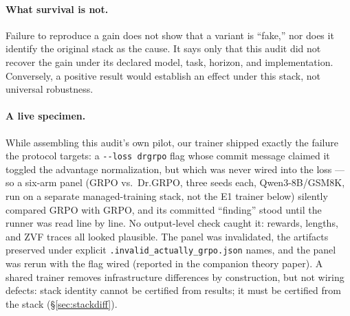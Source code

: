 \documentclass[11pt]{article}
\newcommand{\zvf}{\textnormal{ZVF}}
\begin{document}
\paragraph{What survival is not.} Failure to reproduce a gain does not show
that a variant is ``fake,'' nor does it identify the original stack as the
cause. It says only that this audit did not recover the gain under its declared
model, task, horizon, and implementation. Conversely, a positive result would
establish an effect under this stack, not universal robustness.

\paragraph{A live specimen.} While assembling this audit's own pilot, our
trainer shipped exactly the failure the protocol targets: a
\texttt{-{}-loss drgrpo} flag whose commit message claimed it toggled the
advantage normalization, but which was never wired into the loss --- so a
six-arm panel (GRPO vs.\ Dr.GRPO, three seeds each, Qwen3-8B/GSM8K, run on a
separate managed-training stack, not the E1 trainer below) silently compared
GRPO with GRPO, and its committed ``finding'' stood until the runner was read
line by line. No output-level check caught it: rewards, lengths, and \zvf{}
traces all looked plausible. The panel was invalidated, the artifacts
preserved under explicit \texttt{.invalid\_actually\_grpo.json} names, and the
panel was rerun with the flag wired (reported in the companion theory paper).
A shared trainer removes infrastructure differences by construction, but not
wiring defects: stack identity cannot be certified from results; it must be
certified from the stack (\S\ref{sec:stackdiff}).
\end{document}

